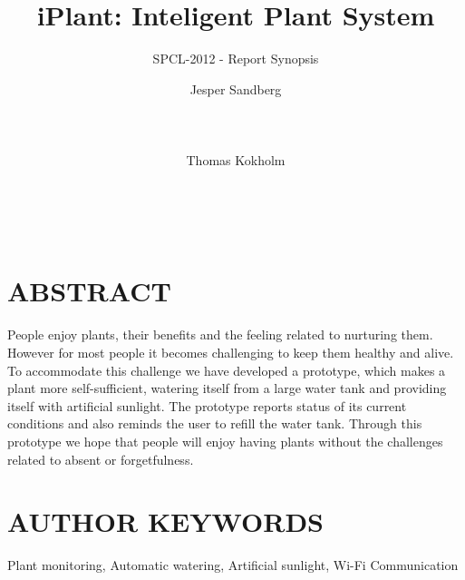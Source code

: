 \documentclass{ubicomp2012}
\begin{document}
\setlength{\paperheight}{11in}
\setlength{\paperwidth}{8.5in}
\setlength{\pdfpageheight}{\paperheight}
\setlength{\pdfpagewidth}{\paperwidth}




\title{iPlant: Inteligent Plant System}
\subtitle{SPCL-2012 - Report Synopsis}
\author{
  \alignauthor Jesper Sandberg\\
    \\
    \\
    \\
 \alignauthor Thomas Kokholm\\
    \\
    \\
    \\
      }
\maketitle

\section{ABSTRACT}
People enjoy plants, their benefits and the feeling related to nurturing them. However for most people it becomes challenging to keep them healthy and alive. To accommodate this challenge we have developed a prototype, which makes a plant more self-sufficient, watering itself from a large water tank and providing itself with artificial sunlight.
The prototype reports status of its current conditions and also reminds the user to refill the water tank.
Through this prototype we hope that people will enjoy having plants without the challenges related to absent or forgetfulness.

\section{AUTHOR KEYWORDS}
Plant monitoring, Automatic watering, Artificial sunlight, Wi-Fi Communication
\end{document}
